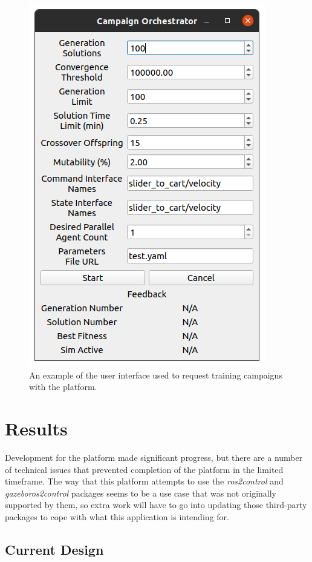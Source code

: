 \documentclass[conference]{IEEEtran}
\begin{document}
	\begin{figure}[htbp]
		\centerline{\includegraphics[width=0.75\columnwidth]{images/campaign_orchestrator_ui.png}}
		\caption{An example of the user interface used to request training campaigns with the platform.}
		\label{fig:campaign_orchestrator_ui}
	\end{figure}

	\section{Results}

	Development for the platform made significant progress, but there are a number of technical issues that prevented completion of the platform in the limited timeframe. The way that this platform attempts to use the \textit{ros2\textunderscore control} and \textit{gazebo\textunderscore ros2\textunderscore control} packages seems to be a use case that was not originally supported by them, so extra work will have to go into updating those third-party packages to cope with what this application is intending for.

	\subsection{Current Design}
\end{document}
